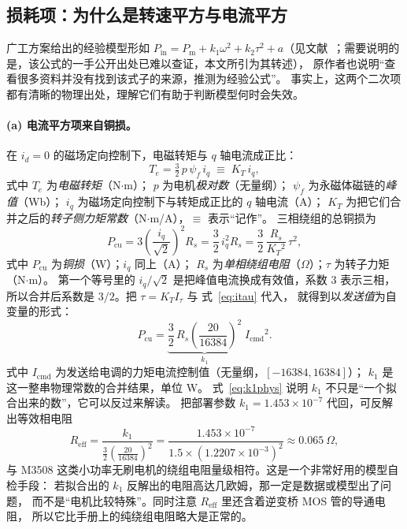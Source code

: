 \documentclass[cn,blue,11pt,device=normal]{elegantnote}
\newcommand{\Pin}{P_{\mathrm{in}}{}}
\newcommand{\Pmech}{P_{\mathrm{m}}{}}
\newcommand{\Icmd}{I_{\mathrm{cmd}}{}}
\newcommand{\Itau}{I_{\tau}{}}
\newcommand{\KT}{K_{T}{}}
\newcommand{\fref}[1]{式~\eqref{#1}}
\begin{document}
\subsection{损耗项：为什么是转速平方与电流平方}\label{sec:loss}

广工方案给出的经验模型形如 $\Pin = \Pmech + k_1\omega^2 + k_2\tau^2 + a$（见文献~\cite{gdutpowerformula}；需要说明的是，该公式的一手公开出处已难以查证，本文所引为其转述），
原作者也说明“查看很多资料并没有找到该式子的来源，推测为经验公式”。
事实上，这两个二次项都有清晰的物理出处，理解它们有助于判断模型何时会失效。

\paragraph{(a) 电流平方项来自铜损。}
在 $i_d = 0$ 的磁场定向控制下，电磁转矩与 $q$ 轴电流成正比：
\begin{equation}
  T_e = \tfrac{3}{2}\,p\,\psi_f\,i_q \;\equiv\; \KT\,i_q ,
\end{equation}
式中 $T_e$ 为\emph{电磁转矩}（N$\cdot$m）；
$p$ 为电机\emph{极对数}（无量纲）；
$\psi_f$ 为永磁体磁链的\emph{峰值}（Wb）；
$i_q$ 为磁场定向控制下与转矩成正比的 $q$ 轴电流（A）；
$\KT$ 为把它们合并之后的\emph{转子侧力矩常数}（N$\cdot$m/A），$\equiv$ 表示“记作”。
三相绕组的总铜损为
\begin{equation}
  P_{\mathrm{cu}} = 3\left(\frac{i_q}{\sqrt{2}}\right)^2 R_s
  = \frac{3}{2}\,i_q^2 R_s
  = \frac{3}{2}\,\frac{R_s}{\KT^2}\,\tau^2 ,
\end{equation}
式中 $P_{\mathrm{cu}}$ 为\emph{铜损}（W）；$i_q$ 同上（A）；
$R_s$ 为\emph{单相绕组电阻}（$\Omega$）；$\tau$ 为转子力矩（N$\cdot$m）。
第一个等号里的 $i_q/\sqrt{2}$ 是把峰值电流换成有效值，系数 $3$ 表示三相，
所以合并后系数是 $3/2$。把 $\tau = \KT\Itau$ 与 \fref{eq:itau} 代入，
就得到以\emph{发送值}为自变量的形式：
\begin{equation}\label{eq:k1phys}
  P_{\mathrm{cu}} = \underbrace{\frac{3}{2}\,R_s\left(\frac{20}{16384}\right)^{2}}_{k_1}\;\Icmd^2 .
\end{equation}
式中 $\Icmd$ 为发送给电调的力矩电流控制值（无量纲，$[-16384,16384]$）；
$k_1$ 是这一整串物理常数的合并结果，单位 W。
\fref{eq:k1phys} 说明 $k_1$ 不只是“一个拟合出来的数”，它可以反过来解读。
把部署参数 $k_1 = 1.453\times10^{-7}$ 代回，可反解出等效相电阻
\begin{equation}\label{eq:reff}
  R_{\mathrm{eff}} = \frac{k_1}{\tfrac{3}{2}\left(\frac{20}{16384}\right)^{2}}
  = \frac{1.453\times10^{-7}}{1.5\times(1.2207\times10^{-3})^{2}}
  \approx 0.065\ \Omega ,
\end{equation}
与 M3508 这类小功率无刷电机的绕组电阻量级相符。这是一个非常好用的模型自检手段：
若拟合出的 $k_1$ 反解出的电阻高达几欧姆，那一定是数据或模型出了问题，
而不是“电机比较特殊”。同时注意 $R_{\mathrm{eff}}$ 里还含着逆变桥 MOS 管的导通电阻，
所以它比手册上的纯绕组电阻略大是正常的。
\end{document}
